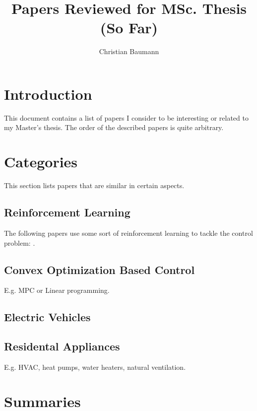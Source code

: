 \documentclass[a4paper]{article}
\title{Papers Reviewed for MSc. Thesis (So Far)}
\author{Christian Baumann}
\begin{document}
\begin{multicols}{2}
	
	\maketitle
	
	\section{Introduction}
	\label{sec:intro}
	
	This document contains a list of papers I consider to
	be interesting or related to my Master's thesis.
	The order of the described papers is quite arbitrary.
	
	\section{Categories}
	
	This section lists papers that are similar in certain aspects.
	
	\subsection{Reinforcement Learning}
	
	The following papers use some sort of reinforcement learning 
	to tackle the control problem: 
	\cite{7401112, 6102330, 8060306, CHEN2018195, 7178338, 6695263, LDPWB2012, 
	8727484, 8335743, 7056534, 4717266}.
	
	\subsection{Convex Optimization Based Control}
	
	E.g. MPC or Linear programming. \cite{4717266}
	
	\subsection{Electric Vehicles}
	
	\subsection{Residental Appliances}
	
	E.g. HVAC, heat pumps, water heaters, natural ventilation.
	
	\section{Summaries}
	

\end{multicols}
\end{document}
